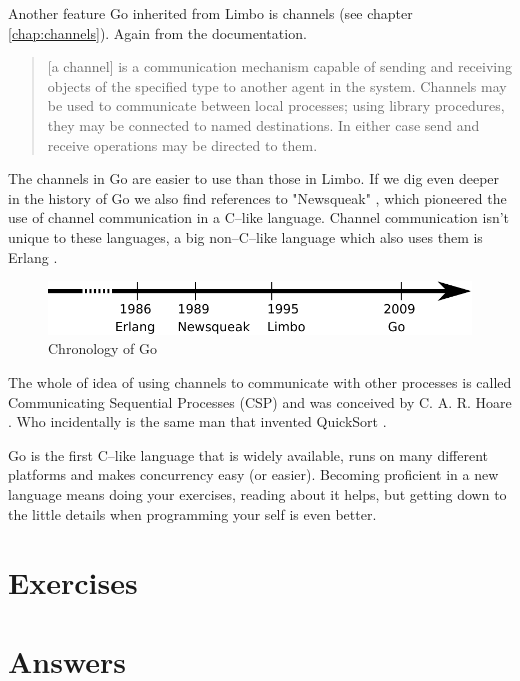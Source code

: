 Another feature Go inherited from Limbo is channels (see chapter
\ref{chap:channels}). Again from the documentation.
\begin{quote}
[a channel] is a communication mechanism capable of sending and receiving objects of
the specified type to another agent in the system. Channels may be used
to communicate between local processes; using library procedures, they
may be connected to named destinations. In either case send and receive
operations may be directed to them.
\end{quote}
The channels in Go are easier to use than those in Limbo.
If we dig even deeper in the history of Go we also find references
to "Newsqueak" \cite{newsqueak}, which pioneered the use of 
channel communication in a C--like language. Channel
communication isn't unique to these languages, a big non--C--like
language which also uses them is Erlang \cite{erlang}.

\begin{figure}[H]
\caption{Chronology of Go}
\label{fig:chrono-of-go}
\begin{center}
\includegraphics[scale=0.65]{fig/go-history.pdf}
\end{center}
\end{figure}

The whole of idea of using channels to communicate with other processes
is called Communicating Sequential Processes (CSP) and was conceived
by C. A. R. Hoare \cite{hoare}. Who incidentally is the same man that
invented QuickSort \cite{Quicksort}.

\begin{lbar}
Go is the first C--like language that is widely available,
runs on many
different platforms and makes concurrency easy (or easier).
Becoming proficient in a new language means doing your exercises,
reading about it helps, but getting down to the little details when 
programming your self is even better.
\end{lbar}

\section{Exercises}


\cleardoublepage
\section{Answers}
\shipoutAnswer
